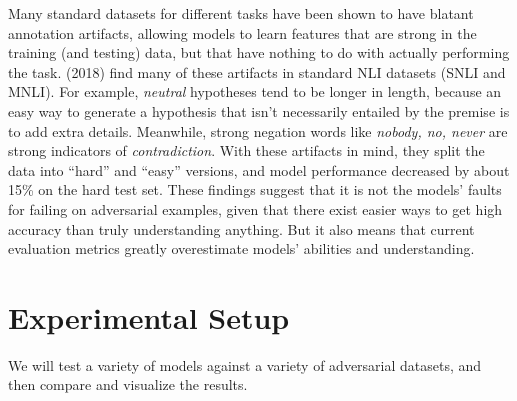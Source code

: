 \documentclass[letterpaper]{article}
\begin{document}
Many standard datasets for different tasks have been shown to have blatant annotation artifacts, allowing models to learn features that are strong in the training (and testing) data, but that have nothing to do with actually performing the task.
\citeauthor{gururangan_annotation_2018} (2018) find many of these artifacts in standard NLI datasets (SNLI and MNLI).
For example, \emph{neutral} hypotheses tend to be longer in length, because an easy way to generate a hypothesis that isn't necessarily entailed by the premise is to add extra details.
Meanwhile, strong negation words like \emph{nobody, no, never} are strong indicators of \emph{contradiction}.
With these artifacts in mind, they split the data into ``hard'' and ``easy'' versions, and model performance decreased by about 15\% on the hard test set.
These findings suggest that it is not the models' faults for failing on adversarial examples, given that there exist easier ways to get high accuracy than truly understanding anything.
But it also means that current evaluation metrics greatly overestimate models' abilities and understanding.

\section{Experimental Setup}
We will test a variety of models against a variety of adversarial datasets, and then compare and visualize the results.
\end{document}
